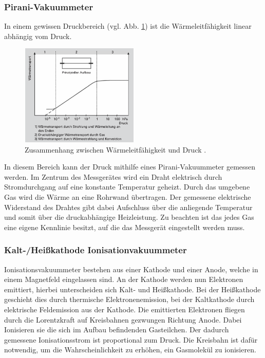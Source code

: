 \subsubsection{Pirani-Vakuummeter}
In einem gewissen Druckbereich (vgl. Abb. \ref{fig:wärme}) ist die Wärmeleitfähigkeit linear abhängig vom Druck.
\begin{figure}[h]
    \centering
    \includegraphics[width=0.5\textwidth]{abb/waerme.png}
    \caption{Zusammenhang zwischen Wärmeleitfähigkeit und Druck \cite{Pfeifer}.}
    \label{fig:wärme}
\end{figure}
In diesem Bereich kann der Druck mithilfe eines Pirani-Vakuummeter gemessen werden.
Im Zentrum des Messgerätes wird ein Draht elektrisch durch Stromdurchgang auf eine konstante Temperatur geheizt.
Durch das umgebene Gas wird die Wärme an eine Rohrwand übertragen. 
Der gemessene elektrische Widerstand des Drahtes gibt dabei Aufschluss über die anliegende Temperatur und somit über die druckabhängige Heizleistung.
Zu beachten ist das jedes Gas eine eigene Kennlinie besitzt,
auf die das Messgerät eingestellt werden muss.

\subsubsection{Kalt-/Heißkathode Ionisationvakuummeter}
Ionisationsvakuummeter bestehen aus einer Kathode und einer Anode,
welche in einem Magnetfeld eingelassen sind.
An der Kathode werden nun Elektronen emittiert,
hierbei unterscheiden sich Kalt- und Heißkathode.
Bei der Heißkathode geschieht dies durch thermische Elektronenemission,
bei der Kaltkathode durch elektrische Feldemission aus der Kathode.
Die emittierten Elektronen fliegen
durch die Lorentzkraft auf Kreisbahnen gezwungen
Richtung Anode.
Dabei Ionisieren sie die sich im Aufbau befindenden Gasteilchen.
Der dadurch gemessene Ionisationsstrom ist proportional zum Druck.
Die Kreisbahn ist dafür notwendig,
um die Wahrscheinlichkeit zu erhöhen, ein Gasmolekül zu ionisieren. 
